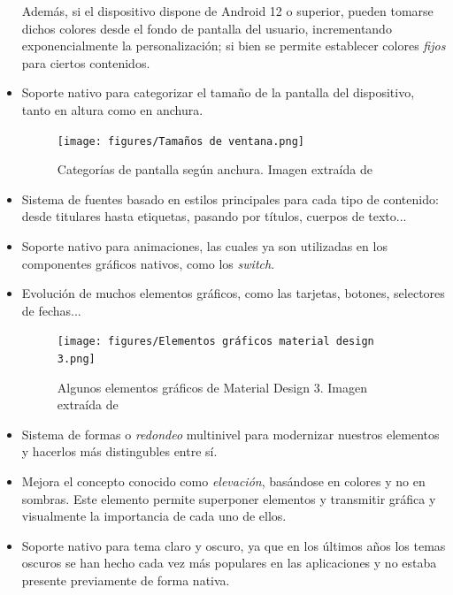 \begin{itemize}
                Además, si el dispositivo dispone de Android 12 o superior, pueden tomarse dichos
                colores desde el fondo de pantalla del usuario, incrementando exponencialmente la personalización;
                si bien se permite establecer colores \textit{fijos} para ciertos contenidos.
                \item Soporte nativo para categorizar el tamaño de la pantalla del dispositivo, tanto en altura como
                en anchura.
                    \begin{figure}[h]
                        \centering
                        \texttt{[image: figures/Tamaños de ventana.png]}
                        \caption[Categorías de pantalla según anchura]
                        {Categorías de pantalla según anchura. Imagen extraída de \cite{singh_material_2022}}
                        \label{figure:material_design_3:width_classes}
                    \end{figure}
                \item Sistema de fuentes basado en estilos principales para cada tipo de contenido: desde titulares 
                hasta etiquetas, pasando por títulos, cuerpos de texto...
                \item Soporte nativo para animaciones, las cuales ya son utilizadas en los componentes gráficos nativos,
                como los \textit{switch}.
                \item Evolución de muchos elementos gráficos, como las tarjetas, botones, selectores de fechas...
                    \begin{figure}[h]
                        \centering
                        \texttt{[image: figures/Elementos gráficos material design 3.png]}
                        \caption[Algunos elementos gráficos de Material Design 3]
                        {Algunos elementos gráficos de Material Design 3. Imagen extraída de \cite{cerda_material_2022}}
                        \label{figure:material_design_3:elementos_graficos}
                    \end{figure}
                \item Sistema de formas o \textit{redondeo} multinivel para modernizar nuestros elementos y hacerlos
                más distingubles entre sí.
        
                \item Mejora el concepto conocido como \textit{elevación}, basándose en colores y no en sombras. Este
                elemento permite superponer elementos y transmitir gráfica y visualmente la importancia de cada 
                uno de ellos.
                \item Soporte nativo para tema claro y oscuro, ya que en los últimos años los temas oscuros 
                se han hecho cada vez más populares en las aplicaciones y no estaba presente previamente de forma nativa.
            \end{itemize}

